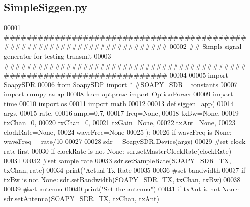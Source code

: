 \subsection{Simple\+Siggen.\+py}
\label{SimpleSiggen_8py_source}

\begin{DoxyCode}
00001 \textcolor{comment}{########################################################################}
00002 \textcolor{comment}{## Simple signal generator for testing transmit}
00003 \textcolor{comment}{########################################################################}
00004 
00005 \textcolor{keyword}{import} SoapySDR
00006 \textcolor{keyword}{from} SoapySDR \textcolor{keyword}{import} * \textcolor{comment}{#SOAPY\_SDR\_ constants}
00007 \textcolor{keyword}{import} numpy \textcolor{keyword}{as} np
00008 \textcolor{keyword}{from} optparse \textcolor{keyword}{import} OptionParser
00009 \textcolor{keyword}{import} time
00010 \textcolor{keyword}{import} os
00011 \textcolor{keyword}{import} math
00012 
00013 \textcolor{keyword}{def }siggen_app(
00014     args,
00015     rate,
00016     ampl=0.7,
00017     freq=\textcolor{keywordtype}{None},
00018     txBw=\textcolor{keywordtype}{None},
00019     txChan=0,
00020     rxChan=0,
00021     txGain=\textcolor{keywordtype}{None},
00022     txAnt=\textcolor{keywordtype}{None},
00023     clockRate=\textcolor{keywordtype}{None},
00024     waveFreq=\textcolor{keywordtype}{None}
00025 ):
00026     \textcolor{keywordflow}{if} waveFreq \textcolor{keywordflow}{is} \textcolor{keywordtype}{None}: waveFreq = rate/10
00027 
00028     sdr = SoapySDR.Device(args)
00029     \textcolor{comment}{#set clock rate first}
00030     \textcolor{keywordflow}{if} clockRate \textcolor{keywordflow}{is} \textcolor{keywordflow}{not} \textcolor{keywordtype}{None}: sdr.setMasterClockRate(clockRate)
00031 
00032     \textcolor{comment}{#set sample rate}
00033     sdr.setSampleRate(SOAPY\_SDR\_TX, txChan, rate)
00034     print(\textcolor{stringliteral}{"Actual Tx Rate %
00035 
00036     \textcolor{comment}{#set bandwidth}
00037     \textcolor{keywordflow}{if} txBw \textcolor{keywordflow}{is} \textcolor{keywordflow}{not} \textcolor{keywordtype}{None}: sdr.setBandwidth(SOAPY\_SDR\_TX, txChan, txBw)
00038 
00039     \textcolor{comment}{#set antenna}
00040     print(\textcolor{stringliteral}{"Set the antenna"})
00041     \textcolor{keywordflow}{if} txAnt \textcolor{keywordflow}{is} \textcolor{keywordflow}{not} \textcolor{keywordtype}{None}: sdr.setAntenna(SOAPY\_SDR\_TX, txChan, txAnt)
}
\end{DoxyCode}
